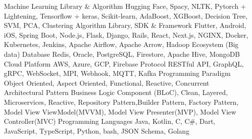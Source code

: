 
\horizontalLineRight

\skillItem
    {Machine Learning Library \& Algorithm}
    {Hugging Face, Spacy, NLTK, Pytorch + Lightening, Tensorflow + keras, Scikit-learn, AdaBoost, XGBoost, Decision Tree, SVM, PCA, Clustering Algorithm}
\skillItem
    {Library, SDK \& Framework}
    {Flutter, Android, iOS, Spring Boot, Node.js, Flask,
        Django, Rails,
        React, Next.js, NGINX, Docker, Kubernetes,
        Jenkins, Apache Airflow, Apache Arrow, Hadoop Ecosystem (Big data)}
\skillItem
    {Database}
    {Redis, Oracle, PostgreSQL, Firestore, Apache Hive, MongoDB}
\skillItem
    {Cloud Platform}
    {AWS, Azure, GCP, Firebase}
\skillItem
    {Protocol}
    {RESTful API, GraphQL, gRPC, WebSocket, MPI, Webhook, MQTT, Kafka}
\skillItem
    {Programming Paradigm}
    {Object Oriented, Aspect Oriented, Functional, Reactive, Concurrent}
\skillItem
    {Architectural Pattern}
    {Business Logic Component (BLoC), Clean, Layered, Microservices, Reactive, Repository Pattern,Builder Pattern,
        Factory Pattern, Model View ViewModel(MVVM), Model View Presenter(MVP), Model View Controller(MVC)}
\skillItem
    {Programming Languages}
    {Java, Kotlin, C, C\#, Dart, JavaScript, TypeScript, Python, bash, JSON Schema, Golang}